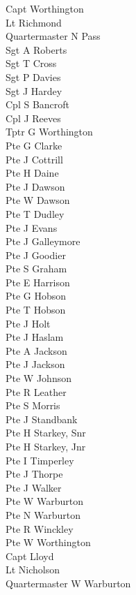 \begin{multicols}{2}
  \noindent
  Capt Worthington \\
  Lt Richmond \\
  Quartermaster N Pass \\
  Sgt A Roberts \\
  Sgt T Cross \\
  Sgt P Davies \\
  Sgt J Hardey \\
  Cpl S Bancroft \\
  Cpl J Reeves \\
  Tptr G Worthington \\
  Pte G Clarke \\
  Pte J Cottrill \\
  Pte H Daine \\
  Pte J Dawson \\
  Pte W Dawson \\
  Pte T Dudley \\
  Pte J Evans \\
  Pte J Galleymore \\
  Pte J Goodier \\
  Pte S Graham \\
  Pte E Harrison \\
  Pte G Hobson \\
  Pte T Hobson \\
  Pte J Holt \\
  Pte J Haslam \\
  Pte A Jackson \\
  Pte J Jackson \\
  Pte W Johnson \\
  Pte R Leather \\
  Pte S Morris \\
  Pte J Standbank \\
  Pte H Starkey, Snr \\
  Pte H Starkey, Jnr \\
  Pte I Timperley \\
  Pte J Thorpe \\
  Pte J Walker \\
  Pte W Warburton \\
  Pte N Warburton \\
  Pte R Winckley \\
  Pte W Worthington \\
  Capt Lloyd \\
  Lt Nicholson \\
  Quartermaster W Warburton \\

\end{multicols}
